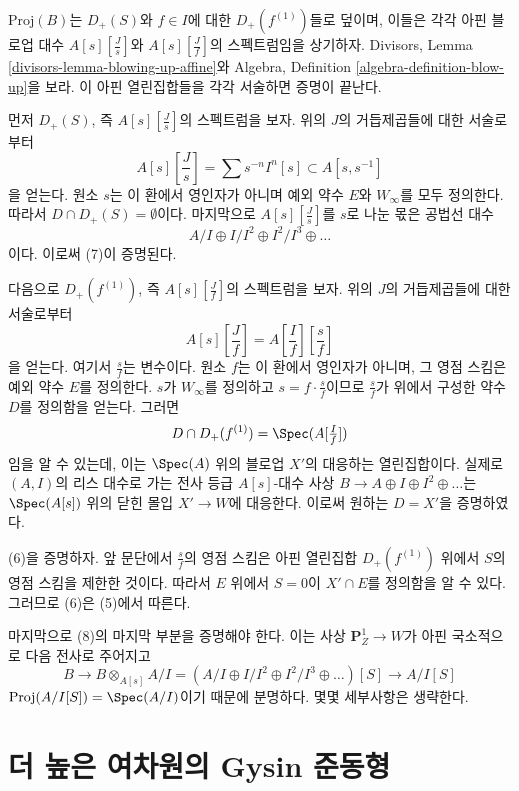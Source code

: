 \medskip\noindent
$\text{Proj}(B)$는 $D_+(S)$와 $f \in I$에 대한
$D_+(f^{(1)})$들로 덮이며, 이들은 각각 아핀 블로업 대수
$A[s][\frac{J}{s}]$와 $A[s][\frac{J}{f}]$의 스펙트럼임을 상기하자.
Divisors, Lemma \ref{divisors-lemma-blowing-up-affine}와
Algebra, Definition \ref{algebra-definition-blow-up}을 보라.
이 아핀 열린집합들을 각각 서술하면 증명이 끝난다.

\medskip\noindent
먼저 $D_+(S)$, 즉 $A[s][\frac{J}{s}]$의 스펙트럼을 보자. 위의
$J$의 거듭제곱들에 대한 서술로부터
$$
A[s][\textstyle{\frac{J}{s}}] = \sum s^{-n}I^n[s] \subset A[s, s^{-1}]
$$
을 얻는다. 원소 $s$는 이 환에서 영인자가 아니며 예외 약수 $E$와
$W_\infty$를 모두 정의한다. 따라서 $D \cap D_+(S) = \emptyset$이다.
마지막으로 $A[s][\frac{J}{s}]$를 $s$로 나눈 몫은 공법선 대수
$$
A/I \oplus I/I^2 \oplus I^2/I^3 \oplus \ldots
$$
이다. 이로써 (7)이 증명된다.

\medskip\noindent
다음으로 $D_+(f^{(1)})$, 즉 $A[s][\frac{J}{f}]$의 스펙트럼을 보자.
위의 $J$의 거듭제곱들에 대한 서술로부터
$$
A[s][\textstyle{\frac{J}{f}}] =
A[\textstyle{\frac{I}{f}}][\textstyle{\frac{s}{f}}]
$$
을 얻는다. 여기서 $\frac{s}{f}$는 변수이다. 원소 $f$는 이 환에서
영인자가 아니며, 그 영점 스킴은 예외 약수 $E$를 정의한다.
$s$가 $W_\infty$를 정의하고 $s = f \cdot \frac{s}{f}$이므로
$\frac{s}{f}$가 위에서 구성한 약수 $D$를 정의함을 얻는다. 그러면
$$
D \cap D_+(f^{(1)}) = \Spec(A[\textstyle{\frac{I}{f}}])
$$
임을 알 수 있는데, 이는 $\Spec(A)$ 위의 블로업 $X'$의 대응하는
열린집합이다. 실제로 $(A, I)$의 리스 대수로 가는 전사 등급
$A[s]$-대수 사상
$B \to A \oplus I \oplus I^2 \oplus \ldots$는
$\Spec(A[s])$ 위의 닫힌 몰입 $X' \to W$에 대응한다.
이로써 원하는 $D = X'$을 증명하였다.

\medskip\noindent
(6)을 증명하자. 앞 문단에서 $\frac{s}{f}$의 영점 스킴은 아핀
열린집합 $D_+(f^{(1)})$ 위에서 $S$의 영점 스킴을 제한한 것이다.
따라서 $E$ 위에서 $S = 0$이 $X' \cap E$를 정의함을 알 수 있다.
그러므로 (6)은 (5)에서 따른다.

\medskip\noindent
마지막으로 (8)의 마지막 부분을 증명해야 한다. 이는 사상
$\mathbf{P}^1_Z \to W$가 아핀 국소적으로 다음 전사로 주어지고
$$
B \to B \otimes_{A[s]} A/I =
(A/I \oplus I/I^2 \oplus I^2/I^3 \oplus \ldots)[S] \to
A/I[S]
$$
$\text{Proj}(A/I[S]) = \Spec(A/I)$이기 때문에 분명하다.
몇몇 세부사항은 생략한다.






\section{더 높은 여차원의 Gysin 준동형}
\label{section-gysin-higher-codimension}

